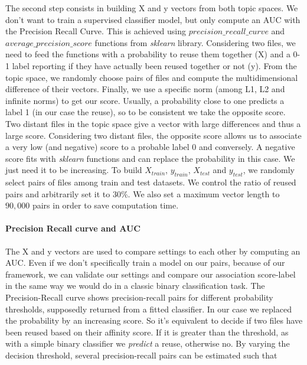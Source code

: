 \documentclass[a4paper]{article}
\begin{document}
	The second step consists in building X and y vectors from both topic spaces. We don't want to train a supervised classifier model, but only compute an \ac{AUC} with the Precision Recall Curve. This is achieved using \emph{$precision\_recall\_curve$} and \emph{$average\_precision\_score$} functions from \emph{sklearn} library. Considering two files, we need to feed the functions with a probability to reuse them together (X) and a 0-1 label reporting if they have actually been reused together or not (y). From the topic space, we randomly choose pairs of files and compute the multidimensional difference of their vectors. Finally, we use a specific norm (among L1, L2 and infinite norms) to get our score. Usually, a probability close to one predicts a label 1 (in our case the reuse), so to be consistent we take the opposite score. Two distant files in the topic space give a vector with large differences and thus a large score. Considering two distant files, the opposite score allows us to associate a very low (and negative) score to a probable label 0 and conversely. A negative score fits with \emph{sklearn} functions and can replace the probability in this case. We just need it to be increasing. To build $X_{train}$, $y_{train}$, $X_{test}$ and $y_{test}$, we randomly select pairs of files among train and test datasets. We control the ratio of reused pairs and arbitrarily set it to 30\%. We also set a maximum vector length to $90,000$ pairs in order to save computation time. 
	
	\paragraph{Precision Recall curve and AUC}
	
	The X and y vectors are used to compare settings to each other by computing an \ac{AUC}. Even if we don't specifically train a model on our pairs, because of our framework, we can validate our settings and compare our association score-label in the same way we would do in a classic binary classification task.
	The Precision-Recall curve shows precision-recall pairs for different probability thresholds, supposedly returned from a fitted classifier. In our case we replaced the probability by an increasing score. So it's equivalent to decide if two files have been reused based on their affinity score. If it is greater than the threshold, as with a simple binary classifier we \textit{predict} a reuse, otherwise no. By varying the decision threshold, several precision-recall pairs can be estimated such that
	
\end{document}
